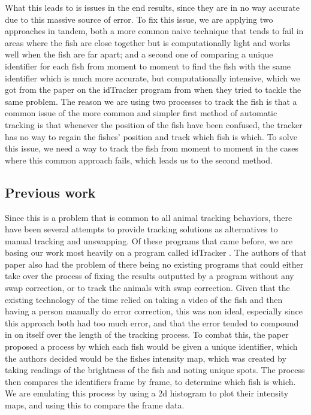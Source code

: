 \documentclass{article}
\begin{document}
What this leads to is issues in the end results, since they are in no way accurate due to this massive source of error. To fix this issue, we are applying two approaches in tandem, both a more common naive technique that tends to fail in areas where the fish are close together but is computationally light and works well when the fish are far apart; and a second one of comparing a unique identifier for each fish from moment to moment to find the fish with the same identifier which is much more accurate, but computationally intensive, which we got from the paper on the idTracker program from when they tried to tackle the same problem\cite{idTracker}. The reason we are using two processes to track the fish is that a common issue of the more common and simpler first method of automatic tracking is that whenever the position of the fish have been confused, the tracker has no way to regain the fishes' position and track which fish is which. To solve this issue, we need a way to track the fish from moment to moment in the cases where this common approach fails, which leads us to the second method.

\subsection{Previous work}
 

Since this is a problem that is common to all animal tracking behaviors, there have been several attempts to provide tracking solutions as alternatives to manual tracking and unswapping. Of these programs that came before, we are basing our work most heavily on a program called idTracker \cite{idTracker}. The authors of that paper also had the problem of there being no existing programs that could either take over the process of fixing the results outputted by a program without any swap correction, or to track the animals with swap correction. Given that the existing technology of the time relied on taking a video of the fish and then having a person manually do error correction, this was non ideal, especially since this approach both had too much error, and that the error tended to compound in on itself over the length of the tracking process. To combat this, the paper proposed a process by which each fish would be given a unique identifier, which the authors decided would be the fishes intensity map, which was created by taking readings of the brightness of the fish and noting unique spots. The process then compares the identifiers frame by frame, to determine which fish is which. We are emulating this process by using a 2d histogram to plot their intensity maps, and using this to compare the frame data.
\end{document}
